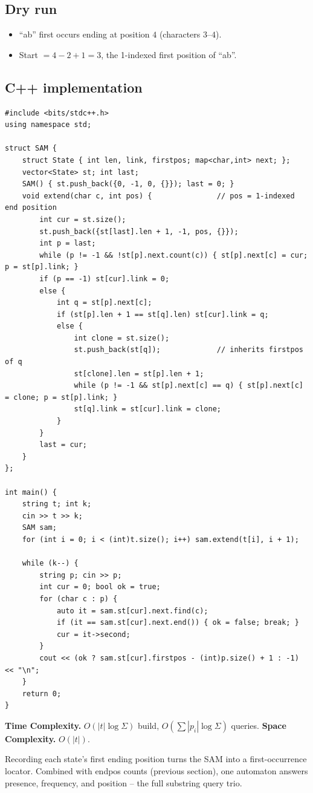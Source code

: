 \subsection*{Dry run}


\begin{itemize}
  \item ``ab'' first occurs ending at position $4$ (characters $3$--$4$).
  \item Start $=4-2+1=3$, the 1-indexed first position of ``ab''.
\end{itemize}

\subsection*{C++ implementation}

\begin{lstlisting}
#include <bits/stdc++.h>
using namespace std;

struct SAM {
    struct State { int len, link, firstpos; map<char,int> next; };
    vector<State> st; int last;
    SAM() { st.push_back({0, -1, 0, {}}); last = 0; }
    void extend(char c, int pos) {               // pos = 1-indexed end position
        int cur = st.size();
        st.push_back({st[last].len + 1, -1, pos, {}});
        int p = last;
        while (p != -1 && !st[p].next.count(c)) { st[p].next[c] = cur; p = st[p].link; }
        if (p == -1) st[cur].link = 0;
        else {
            int q = st[p].next[c];
            if (st[p].len + 1 == st[q].len) st[cur].link = q;
            else {
                int clone = st.size();
                st.push_back(st[q]);             // inherits firstpos of q
                st[clone].len = st[p].len + 1;
                while (p != -1 && st[p].next[c] == q) { st[p].next[c] = clone; p = st[p].link; }
                st[q].link = st[cur].link = clone;
            }
        }
        last = cur;
    }
};

int main() {
    string t; int k;
    cin >> t >> k;
    SAM sam;
    for (int i = 0; i < (int)t.size(); i++) sam.extend(t[i], i + 1);

    while (k--) {
        string p; cin >> p;
        int cur = 0; bool ok = true;
        for (char c : p) {
            auto it = sam.st[cur].next.find(c);
            if (it == sam.st[cur].next.end()) { ok = false; break; }
            cur = it->second;
        }
        cout << (ok ? sam.st[cur].firstpos - (int)p.size() + 1 : -1) << "\n";
    }
    return 0;
}
\end{lstlisting}

\begin{complexitybox}
\textbf{Time Complexity.} $O(|t|\log\Sigma)$ build, $O(\sum|p_i|
\log\Sigma)$ queries. \textbf{Space Complexity.} $O(|t|)$.
\end{complexitybox}

\begin{takeawaybox}
Recording each state's first ending position turns the SAM into a
first-occurrence locator. Combined with endpos counts (previous section),
one automaton answers presence, frequency, and position -- the full
substring query trio.
\end{takeawaybox}
